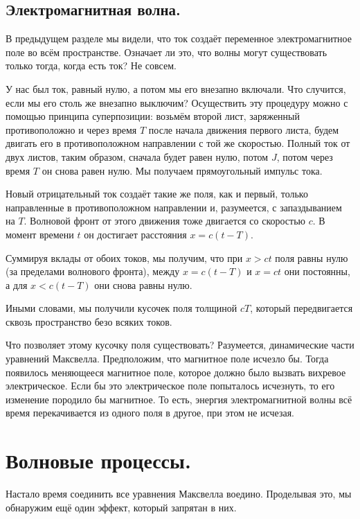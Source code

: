 \documentclass[11pt,a4paper]{article}
\numberwithin{equation}{section}
\begin{document}
\subsection{Электромагнитная волна. }
\label{sec:em_wave}

В предыдущем разделе мы видели, что ток создаёт переменное
электромагнитное поле во всём пространстве. Означает ли это, что волны
могут существовать только тогда, когда есть ток? Не совсем.

У нас был ток, равный нулю, а потом мы его внезапно включали. Что
случится, если мы его столь же внезапно выключим? Осуществить эту
процедуру можно с помощью принципа суперпозиции: возьмём второй лист,
заряженный противоположно и через время $T$ после начала движения
первого листа, будем двигать его в противоположном направлении с той
же скоростью. Полный ток от двух листов, таким образом, сначала будет
равен нулю, потом $J$, потом через время $T$ он снова равен нулю. Мы
получаем прямоугольный импульс тока. 

Новый отрицательный ток создаёт такие же поля, как и первый, только
направленные в противоположном направлении и, разумеется, с
запаздыванием на $T$. Волновой фронт от этого движения тоже двигается
со скоростью $c$. В момент времени $t$ он достигает расстояния $x = c
(t-T)$. 

Суммируя вклады от обоих токов, мы получим, что при $x>ct$ поля равны
нулю (за пределами волнового фронта), между $x=c(t-T)$ и $x=ct$ они
постоянны, а для $x<c(t-T)$ они снова равны нулю. 

Иными словами, мы получили кусочек поля толщиной $cT$, который
передвигается сквозь пространство безо всяких токов. 

Что позволяет этому кусочку поля существовать? Разумеется,
динамические части уравнений Максвелла. Предположим, что магнитное
поле исчезло бы. Тогда появилось меняющееся магнитное поле, которое
должно было вызвать вихревое электрическое. Если бы это электрическое
поле попыталось исчезнуть, то его изменение породило бы магнитное. То
есть, энергия электромагнитной волны всё время перекачивается из
одного поля в другое, при этом не исчезая. 

\section{Волновые процессы.}
\label{sec:waves}

Настало время соединить все уравнения Максвелла воедино. Проделывая
это, мы обнаружим ещё один эффект, который запрятан в них. 
\end{document}
